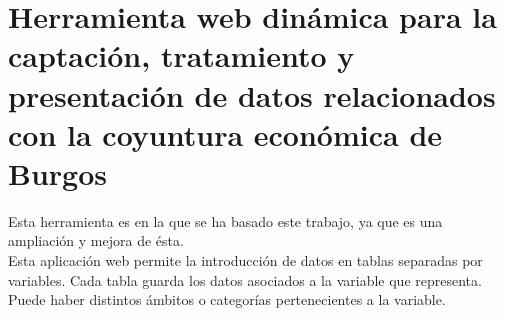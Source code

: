 \section{Herramienta web dinámica para la captación, tratamiento y presentación de datos relacionados con la coyuntura económica de Burgos}
Esta herramienta es en la que se ha basado este trabajo, ya que es una ampliación y mejora de ésta.\\
Esta aplicación web permite la introducción de datos en tablas separadas por variables.
Cada tabla guarda los datos asociados a la variable que representa. Puede haber distintos ámbitos o categorías pertenecientes a la variable.
